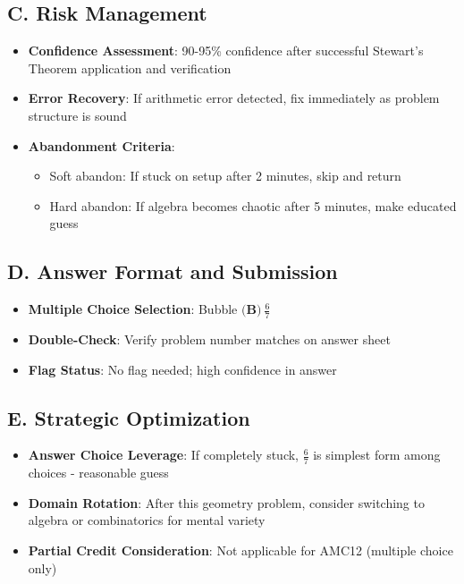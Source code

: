 \documentclass[]{article}
\begin{document}
\begin{competitionbox}
\subsection*{C. Risk Management}
\begin{itemize}[leftmargin=*]
    \item \textbf{Confidence Assessment}: 90-95\% confidence after successful Stewart's Theorem application and verification
    \item \textbf{Error Recovery}: If arithmetic error detected, fix immediately as problem structure is sound
    \item \textbf{Abandonment Criteria}:
    \begin{itemize}
        \item Soft abandon: If stuck on setup after 2 minutes, skip and return
        \item Hard abandon: If algebra becomes chaotic after 5 minutes, make educated guess
    \end{itemize}
\end{itemize}

\subsection*{D. Answer Format and Submission}
\begin{itemize}[leftmargin=*]
    \item \textbf{Multiple Choice Selection}: Bubble $\textbf{(B)}\ \frac{6}{7}$
    \item \textbf{Double-Check}: Verify problem number matches on answer sheet
    \item \textbf{Flag Status}: No flag needed; high confidence in answer
\end{itemize}

\subsection*{E. Strategic Optimization}
\begin{itemize}[leftmargin=*]
    \item \textbf{Answer Choice Leverage}: If completely stuck, $\frac{6}{7}$ is simplest form among choices - reasonable guess
    \item \textbf{Domain Rotation}: After this geometry problem, consider switching to algebra or combinatorics for mental variety
    \item \textbf{Partial Credit Consideration}: Not applicable for AMC12 (multiple choice only)
\end{itemize}
\end{competitionbox}
\end{document}
